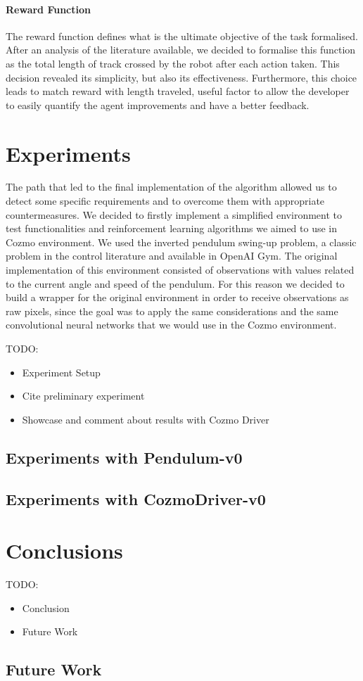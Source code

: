 \documentclass[10pt,twocolumn,letterpaper]{article}
\begin{document}
\paragraph{Reward Function} The reward function defines what is the ultimate objective of the task formalised. After an analysis of the literature available, we decided to formalise this function as the total length of track crossed by the robot after each action taken. This decision revealed its simplicity, but also its effectiveness. Furthermore, this choice leads to match reward with length traveled, useful factor to allow the developer to easily quantify the agent improvements and have a better feedback.

\section{Experiments}

The path that led to the final implementation of the algorithm allowed us to detect some specific requirements and to overcome them with appropriate countermeasures.
We decided to firstly implement a simplified environment to test functionalities and reinforcement learning algorithms we aimed to use in Cozmo environment. We used the inverted pendulum swing-up problem, a classic problem in the control literature and available in OpenAI Gym. 
The original implementation of this environment consisted of observations with values related to the current angle and speed of the pendulum. For this reason we decided to build a wrapper for the original environment in order to receive observations as raw pixels, since the goal was to apply the same considerations and the same convolutional neural networks that we would use in the Cozmo environment.

TODO:
\begin{itemize}
    \item Experiment Setup
    \item Cite preliminary experiment
    \item Showcase and comment about results with Cozmo Driver
\end{itemize}

\subsection{Experiments with Pendulum-v0}

\subsection{Experiments with CozmoDriver-v0}

\section{Conclusions}

TODO:
\begin{itemize}
    \item Conclusion
    \item Future Work
\end{itemize}

\subsection{Future Work}


{\small
    
    
}
\end{document}
